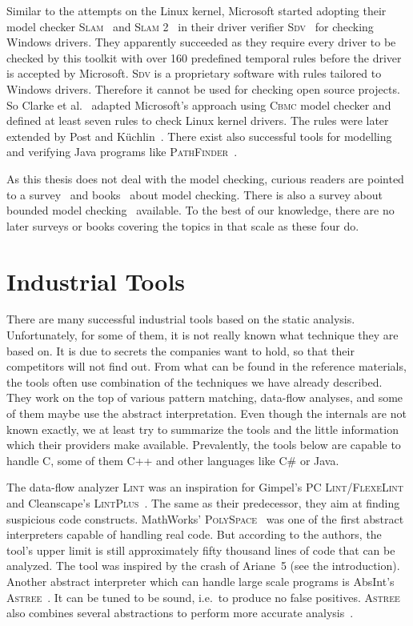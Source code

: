 Similar to the attempts on the Linux kernel, Microsoft started adopting their
model checker \textsc{Slam}~\cite{slam_cav, slam_popl, slam_decade} and
\textsc{Slam 2}~\cite{slam2} in their driver verifier \textsc{Sdv}~\cite{sdv}
for checking Windows drivers. They apparently succeeded as they require every
driver to be checked by this toolkit with over 160 predefined temporal rules
before the driver is accepted by Microsoft.  \textsc{Sdv} is a proprietary
software with rules tailored to Windows drivers.  Therefore it cannot be used
for checking open source projects. So Clarke et al.~\cite{cbmc} adapted
Microsoft's approach using \textsc{Cbmc} model checker and defined at least
seven rules to check Linux kernel drivers. The rules were later extended by
Post and K\"{u}chlin~\cite{slicx}.  There exist also successful tools for
modelling and verifying Java programs like
\textsc{PathFinder}~\cite{pathfinder}.

As this thesis does not deal with the model checking, curious readers are
pointed to a survey~\cite{mc_survey} and books~\cite{mc_book1, mc_book2} about
model checking.  There is also a survey about bounded model
checking~\cite{bmc_survey} available. To the best of our knowledge, there are
no later surveys or books covering the topics in that scale as these four do.

\section{Industrial Tools}\label{sec:industrial}
There are many successful industrial tools based on the static analysis.
Unfortunately, for some of them, it is not really known what technique they
are based on. It is due to secrets the companies want to hold, so that their
competitors will not find out. From what can be found in the reference
materials, the tools often use combination of the techniques we have already
described.  They work on the top of various pattern matching, data-flow
analyses, and some of them maybe use the abstract interpretation.  Even though
the internals are not known exactly, we at least try to summarize the tools
and the little information which their providers make available.  Prevalently,
the tools below are capable to handle C, some of them C++ and other languages
like C\# or Java.

The data-flow analyzer \textsc{Lint} was an inspiration for Gimpel's
\textsc{PC Lint/FlexeLint}~\cite{pclint} and Cleanscape's
\textsc{LintPlus}~\cite{lintplus}. The same as their predecessor, they aim at
finding suspicious code constructs. MathWorks'
\textsc{PolySpace}~\cite{polyspace} was one of the first abstract interpreters
capable of handling real code. But according to the authors, the tool's upper
limit is still approximately fifty thousand lines of code that can be
analyzed.  The tool was inspired by the crash of Ariane~5 (see the
introduction).  Another abstract interpreter which can handle large scale
programs is AbsInt's \textsc{Astree}~\cite{astree}. It can be tuned to be
sound, i.e.\ to produce no false positives.  \textsc{Astree} also combines
several abstractions to perform more accurate analysis~\cite{astree_combine}.

